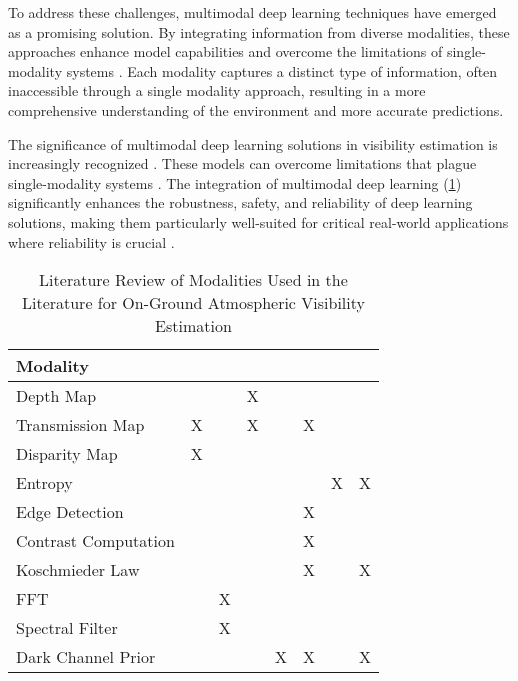 \documentclass{article}
\begin{document}

To address these challenges, multimodal deep learning techniques have emerged as a promising solution. By integrating information from diverse modalities, these approaches enhance model capabilities and overcome the limitations of single-modality systems \cite{liu2018learn, castanedo2013review, molino2021improved, blasch2021machine}. Each modality captures a distinct type of information, often inaccessible through a single modality approach, resulting in a more comprehensive understanding of the environment and more accurate predictions.

The significance of multimodal deep learning solutions in visibility estimation is increasingly recognized \cite{palvanov_visnet_2019, department_of_computer_science_chu_hai_college_of_higher_education_80_castle_peak_road_castle_peak_bay_tuen_mun_nt_hong_kong_meteorology_2020, AitOuadil2023, app11030997, Zhang2023, You2022, Chen2022, Wauben2016, Cheng2018, Zhou2021}. These models can overcome limitations that plague single-modality systems \cite{huang2021makesmultimodallearningbetter}. The integration of multimodal deep learning (\cref{tab:literature_review}) significantly enhances the robustness, safety, and reliability of deep learning solutions, making them particularly well-suited for critical real-world applications where reliability is crucial \cite{6817512, liang2024foundationsmultisensoryartificialintelligence}.



\begin{table}[htbp]
\centering
\caption{Literature Review of Modalities Used in the Literature for On-Ground Atmospheric Visibility Estimation}
\label{tab:literature_review}
\begin{tabular}{@{}lccccccc@{}}
\toprule
\textbf{Modality} & \textbf{\cite{You2022}} & \textbf{\cite{Palvanov2019}} & \textbf{\cite{Zhang2023}} & \textbf{\cite{Chen2022}} & \textbf{\cite{Wauben2016}} & \textbf{\cite{Cheng2018}} & \textbf{\cite{Zhou2021}} \\
\midrule
Depth Map &  & & X & & & & \\
Transmission Map  & X & & X & & X & & \\
Disparity Map & X & & & & & &  \\
Entropy & & & & &  & X & X \\
Edge Detection & & & & & X & &  \\
Contrast Computation   & & & & & X & & \\
Koschmieder Law & &  & & & X & & X \\
FFT & & X & & & & & \\
Spectral Filter & & X & & & & & \\
Dark Channel Prior & & & & X & X & & X\\
\bottomrule
\end{tabular}
\end{table}
\end{document}
